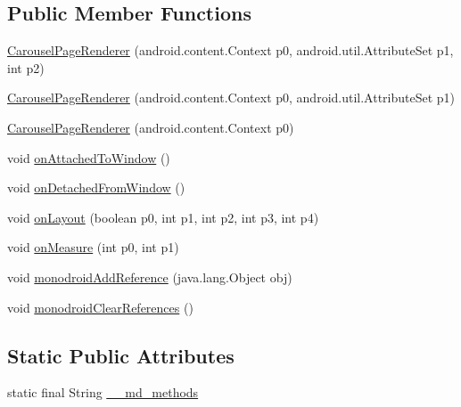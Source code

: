\subsection*{Public Member Functions}
\begin{CompactItemize}
\item 
\hyperlink{classmd5b60ffeb829f638581ab2bb9b1a7f4f3f_1_1_carousel_page_renderer_345df8dd6878c845c18ebccd4fe946ad}{CarouselPageRenderer} (android.content.Context p0, android.util.AttributeSet p1, int p2)
\item 
\hyperlink{classmd5b60ffeb829f638581ab2bb9b1a7f4f3f_1_1_carousel_page_renderer_1854123685532643ee3bacaf48a7c075}{CarouselPageRenderer} (android.content.Context p0, android.util.AttributeSet p1)
\item 
\hyperlink{classmd5b60ffeb829f638581ab2bb9b1a7f4f3f_1_1_carousel_page_renderer_5d9cc96ac94ffa57b9229e1b243f3137}{CarouselPageRenderer} (android.content.Context p0)
\item 
void \hyperlink{classmd5b60ffeb829f638581ab2bb9b1a7f4f3f_1_1_carousel_page_renderer_b5741f0bb83e951d5427e52f40d1abb3}{onAttachedToWindow} ()
\item 
void \hyperlink{classmd5b60ffeb829f638581ab2bb9b1a7f4f3f_1_1_carousel_page_renderer_fe23a27b24ac448267fc932f75ef5716}{onDetachedFromWindow} ()
\item 
void \hyperlink{classmd5b60ffeb829f638581ab2bb9b1a7f4f3f_1_1_carousel_page_renderer_f11f357363dd9368b7df9be259fd7574}{onLayout} (boolean p0, int p1, int p2, int p3, int p4)
\item 
void \hyperlink{classmd5b60ffeb829f638581ab2bb9b1a7f4f3f_1_1_carousel_page_renderer_5bd9181559c99a4fe32a57d915ec6751}{onMeasure} (int p0, int p1)
\item 
void \hyperlink{classmd5b60ffeb829f638581ab2bb9b1a7f4f3f_1_1_carousel_page_renderer_3887bda40516040ce44ded44b90eed5a}{monodroidAddReference} (java.lang.Object obj)
\item 
void \hyperlink{classmd5b60ffeb829f638581ab2bb9b1a7f4f3f_1_1_carousel_page_renderer_e1977d178a6be8e92ddec489238ad42a}{monodroidClearReferences} ()
\end{CompactItemize}
\subsection*{Static Public Attributes}
\begin{CompactItemize}
\item 
static final String \hyperlink{classmd5b60ffeb829f638581ab2bb9b1a7f4f3f_1_1_carousel_page_renderer_a7c3e4156a49e5c3fe304722e1b5019c}{\_\-\_\-md\_\-methods}
\end{CompactItemize}
